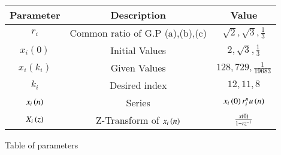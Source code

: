 \renewcommand\thetable{1}
\begin{tabular}{|c|c|c|}
    \hline 
    \textbf{Parameter}&\textbf{Description} &\textbf{Value}\\
    \hline 
    $r_i$ & Common ratio of G.P (a),(b),(c) & $\sqrt{2}, \sqrt{3}, \frac{1}{3}$ \\
    \hline
    $x_i(0)$ & Initial Values & $2, \sqrt{3}, \frac{1}{3}$ \\
    \hline
    $x_i(k_i)$ & Given Values & $128, 729, \frac{1}{19683}$ \\
    \hline 
    $k_i$ & Desired index & $12, 11, 8$ \\
    \hline 
    $x_i\left(n\right)$ & Series & $x_i\left(0\right)r_i^nu\left(n\right)$ \\
    \hline
	$X_i\left(z\right)$ & Z-Transform of $x_i\left(n\right)$ & $\frac{x\left(0\right)}{1-rz^{-1}}$ \\
    \hline
\end{tabular}

\caption{Table of parameters}
\label{Table:1}

